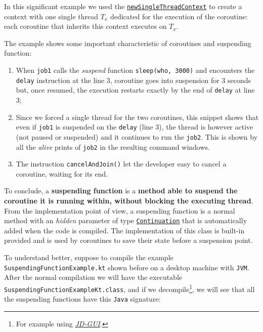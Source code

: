 In this significant example we used the \href{https://kotlinlang.org/api/kotlinx.coroutines/kotlinx-coroutines-core/kotlinx.coroutines/new-single-thread-context.html}{\texttt{newSingleThreadContext}} to create a context with one single thread $T_x$ dedicated for the execution of the coroutine: each coroutine that inherits this context executes on $T_x$.

The example shows some important characteristic of \Kotlin coroutines and suspending function:
\begin{enumerate}
	\item When \texttt{job1} calls the \textit{suspend} function \texttt{sleep(who, 3000)} and encounters the \texttt{delay} instruction at the line $3$, coroutine goes into suspension for $3$ seconds but, once resumed, the execution restarts exactly by the end of \texttt{delay} at line $3$;
	
	\item Since we forced a single thread for the two coroutines, this snippet shows that even if \texttt{job1} is suspended on the \texttt{delay} (line $3$), the thread is however active (not paused or suspended) and it continues to run the \texttt{job2}. This is shown by all the \textit{alive} prints of \texttt{job2} in the resulting command windows.
	
	\item The instruction \texttt{cancelAndJoin()} let the developer easy to cancel a coroutine, waiting for its end.
\end{enumerate}

To conclude, a \textbf{suspending function} is a \Kotlin \textbf{method able to suspend the coroutine it is running within, without blocking the executing thread}. From the implementation point of view, a suspending function is a normal method with an \textit{hidden} parameter of type \href{https://kotlinlang.org/api/latest/jvm/stdlib/kotlin.coroutines/-continuation/}{\texttt{Continuation}} that is automatically added when the code is compiled. The implementation of this class is built-in provided and is used by coroutines to save their state before a suspension point.

To understand better, suppose to compile the example \texttt{SuspendingFunctionExample.kt}  shown before on a desktop machine with \texttt{JVM}. After the normal \Kotlin compilation we will have the executable \texttt{SuspendingFunctionExampleKt.class}, and if we decompile\footnote{For example using \href{https://java-decompiler.github.io/}{\textit{JD-GUI}}.}, we will see that all the suspending functions have this \texttt{Java} signature:

